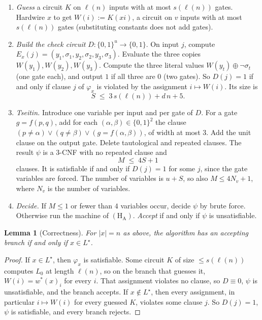\documentclass[10pt]{amsart}
\theoremstyle{plain}
\newtheorem{lemma}[theorem]{Lemma}
\theoremstyle{definition}
\theoremstyle{remark}
\numberwithin{equation}{section}
\begin{document}
\begin{enumerate}[label=\textup{(\arabic*)}]
\item \emph{Guess} a circuit $K$ on $\ell(n)$ inputs with at most $s(\ell(n))$ gates. Hardwire $x$
to get $W(i):=K(xi)$, a circuit on $v$ inputs with at most $s(\ell(n))$ gates (substituting
constants does not add gates).
\item \emph{Build the check circuit} $D\colon\{0,1\}^u\to\{0,1\}$. On input $j$, compute
$E_x(j)=(y_1,\sigma_1,y_2,\sigma_2,y_3,\sigma_3)$. Evaluate the three copies $W(y_1),W(y_2),W(y_3)$.
Compute the three literal values $W(y_t)\oplus\neg\sigma_t$ (one gate each), and output $1$ if all
three are $0$ (two gates). So $D(j)=1$ if and only if clause $j$ of $\varphi_x$ is violated by the
assignment $i\mapsto W(i)$. Its size is
\begin{equation}\label{eq:S}
  S\;\le\;3\,s(\ell(n))+d\,n+5 .
\end{equation}
\item \emph{Tseitin.} Introduce one variable per input and per gate of $D$. For a gate
$g=f(p,q)$, add for each $(\alpha,\beta)\in\{0,1\}^2$ the clause
$(p\ne\alpha)\vee(q\ne\beta)\vee(g=f(\alpha,\beta))$, of width at most $3$. Add the unit clause on
the output gate. Delete tautological and repeated clauses. The result $\psi$ is a $3$-CNF with no
repeated clause and
\begin{equation}\label{eq:M}
  M\;\le\;4S+1
\end{equation}
clauses. It is satisfiable if and only if $D(j)=1$ for some $j$, since the gate variables are
forced. The number of variables is $u+S$, so also $M\le4N_v+1$, where $N_v$ is the number of
variables.
\item \emph{Decide.} If $M\le1$ or fewer than $4$ variables occur, decide $\psi$ by brute force.
Otherwise run the machine of $(\mathrm{H}_{\mathrm{A}})$. \emph{Accept} if and only if $\psi$ is
unsatisfiable.
\end{enumerate}

\begin{lemma}[Correctness]\label{lem:correct}
For $|x|=n$ as above, the algorithm has an accepting branch if and only if $x\in L^\star$.
\end{lemma}

\begin{proof}
If $x\in L^\star$, then $\varphi_x$ is satisfiable. Some circuit $K$ of size $\le s(\ell(n))$
computes $L_0$ at length $\ell(n)$, so on the branch that guesses it,
$W(i)=w^\ast(x)_i$ for every $i$. That assignment violates no clause, so $D\equiv0$, $\psi$ is
unsatisfiable, and the branch accepts. If $x\notin L^\star$, then every assignment, in particular
$i\mapsto W(i)$ for every guessed $K$, violates some clause $j$. So $D(j)=1$, $\psi$ is satisfiable,
and every branch rejects.
\end{proof}
\end{document}
